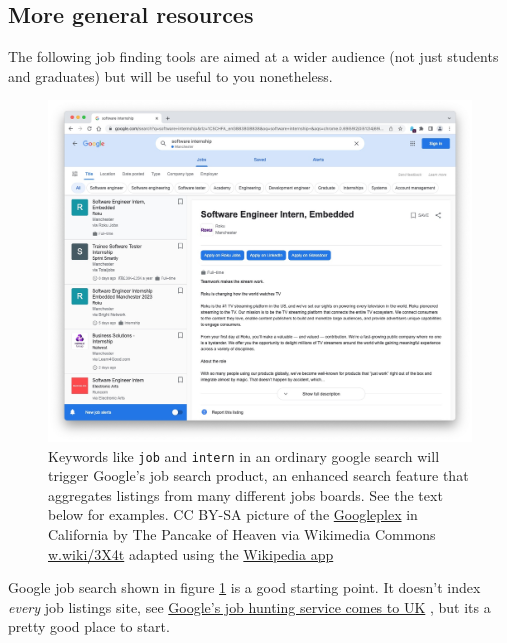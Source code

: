 \documentclass[
]{book}
\begin{document}
\hypertarget{generaljobs}{%
\subsection{More general resources}\label{generaljobs}}

The following job finding tools are aimed at a wider audience (not just students and graduates) but will be useful to you nonetheless.

\begin{figure}

{\centering \includegraphics[width=0.9\linewidth]{images/google-job-search} 

}

\caption{Keywords like \texttt{job} and \texttt{intern} in an ordinary google search will trigger Google's job search product, an enhanced search feature that aggregates listings from many different jobs boards. See the text below for examples. CC BY-SA picture of the \href{https://en.wikipedia.org/wiki/Googleplex}{Googleplex} in California by The Pancake of Heaven via Wikimedia Commons \href{https://w.wiki/3X4t}{w.wiki/3X4t} adapted using the \href{https://apps.apple.com/us/app/wikipedia/id324715238}{Wikipedia app}}\label{fig:googlejobs-fig}
\end{figure}



Google job search shown in figure \ref{fig:googlejobs-fig} is a good starting point. It doesn't index \emph{every} job listings site, see \href{https://www.bbc.co.uk/news/technology-44853472}{Google's job hunting service comes to UK} \citep{noindeed}, but its a pretty good place to start.
\end{document}
